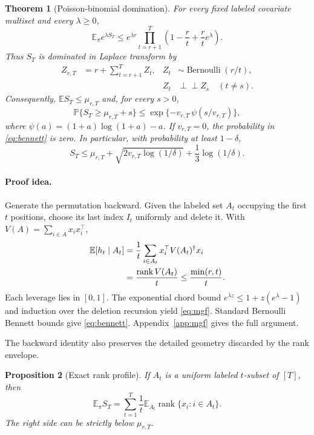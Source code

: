 \documentclass[twoside]{article}
\newtheorem{theorem}{Theorem}
\newtheorem{proposition}[theorem]{Proposition}
\newcommand{\E}{\mathbb E}
\newcommand{\Pp}{\mathbb P}
\newcommand{\rank}{\operatorname{rank}}
\begin{document}
\begin{theorem}[Poisson-binomial domination]
\label{thm:mgf}
For every fixed labeled covariate multiset and every $\lambda\ge0$,
\begin{equation}
 \E_\pi e^{\lambda S_T}
 \le e^{\lambda r}\prod_{t=r+1}^T
 \left(1-\frac rt+\frac rt e^\lambda\right).
 \label{eq:mgf}
\end{equation}
Thus $S_T$ is dominated in Laplace transform by
\begin{align*}
 Z_{r,T}&=r+\sum_{t=r+1}^TZ_t,
 &Z_t&\sim\operatorname{Bernoulli}(r/t),\\[-2pt]
 &&Z_t&\mathrel{\perp}\!\!\!\perp Z_s\quad(t\ne s).
\end{align*}
Consequently, $\E S_T\le\mu_{r,T}$ and, for every $s>0$,
\begin{equation}
 \Pp\{S_T\ge\mu_{r,T}+s\}
 \le \exp\{-v_{r,T}\,\psi(s/v_{r,T})\},
 \label{eq:bennett}
\end{equation}
where $\psi(a)=(1+a)\log(1+a)-a$. If $v_{r,T}=0$, the probability in \eqref{eq:bennett} is zero. In particular, with probability at least $1-\delta$,
\begin{equation}
 S_T\le\mu_{r,T}+\sqrt{2v_{r,T}\log(1/\delta)}
 +\frac13\log(1/\delta).
 \label{eq:bernstein}
\end{equation}
\end{theorem}

\paragraph{Proof idea.}
Generate the permutation backward. Given the labeled set $A_t$ occupying the first $t$ positions, choose its last index $I_t$ uniformly and delete it. With $V(A)=\sum_{i\in A}x_ix_i^\top$,
\begin{align}
 \E[h_t\mid A_t]
 &=\frac1t\sum_{i\in A_t}x_i^\top V(A_t)^\dagger x_i\notag\\
 &=\frac{\rank V(A_t)}t
 \le\frac{\min(r,t)}t.
 \label{eq:backward-mean}
\end{align}
Each leverage lies in $[0,1]$. The exponential chord bound $e^{\lambda z}\le1+z(e^\lambda-1)$ and induction over the deletion recursion yield \eqref{eq:mgf}. Standard Bernoulli Bennett bounds give \eqref{eq:bennett}. Appendix~\ref{app:mgf} gives the full argument.

The backward identity also preserves the detailed geometry discarded by the rank envelope.

\begin{proposition}[Exact rank profile]
\label{prop:profile}
If $A_t$ is a uniform labeled $t$-subset of $[T]$, then
\begin{equation}
 \E_\pi S_T
 =\sum_{t=1}^T\frac1t
 \E_{A_t}\rank\{x_i:i\in A_t\}.
 \label{eq:profile}
\end{equation}
The right side can be strictly below $\mu_{r,T}$.
\end{proposition}
\end{document}
